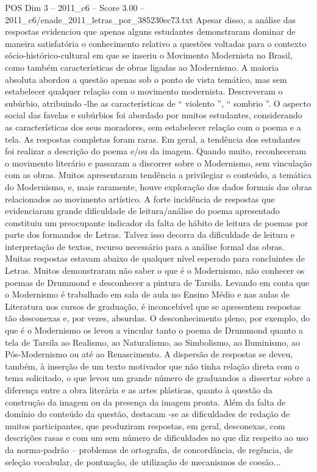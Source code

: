 \begin{textsample}{POS Dim 3 – 2011\_c6 – Score 3.00 – 2011\_c6/enade\_2011\_letras\_por\_385230ec73.txt}
Apesar disso, a análise das respostas evidenciou que apenas alguns estudantes demonstraram dominar de maneira satisfatória o conhecimento relativo a questões voltadas para o contexto sócio-histórico-cultural em que se inseriu o Movimento Modernista no Brasil, como também características de obras ligadas ao Modernismo.
A maioria absoluta abordou a questão apenas sob o ponto de vista temático, mas sem estabelecer qualquer relação com o movimento modernista.
Descreveram o subúrbio, atribuindo -lhe as características de “ violento ”, “ sombrio ”.
O aspecto social das favelas e subúrbios foi abordado por muitos estudantes, considerando as características dos seus moradores, sem estabelecer relação com o poema e a tela.
As respostas completas foram raras.
Em geral, a tendência dos estudantes foi realizar a descrição do poema e/ou da imagem.
Quando muito, reconheceram o movimento literário e passaram a discorrer sobre o Modernismo, sem vinculação com as obras.
Muitos apresentaram tendência a privilegiar o conteúdo, a temática do Modernismo, e, mais raramente, houve exploração dos dados formais das obras relacionados ao movimento artístico.
A forte incidência de respostas que evidenciaram grande dificuldade de leitura/análise do poema apresentado constituiu um preocupante indicador da falta de hábito de leitura de poemas por parte dos formandos de Letras.
Talvez isso decorra da dificuldade de leitura e interpretação de textos, recurso necessário para a análise formal das obras.
Muitas respostas estavam abaixo de qualquer nível esperado para concluintes de Letras.
Muitos demonstraram não saber o que é o Modernismo, não conhecer os poemas de Drummond e desconhecer a pintura de Tarsila.
Levando em conta que o Modernismo é trabalhado em sala de aula no Ensino Médio e nas aulas de Literatura nos cursos de graduação, é inconcebível que se apresentem respostas tão desconexas e, por vezes, absurdas.
O desconhecimento pleno, por exemplo, do que é o Modernismo os levou a vincular tanto o poema de Drummond quanto a tela de Tarsila ao Realismo, ao Naturalismo, ao Simbolismo, ao Iluminismo, ao Pós-Modernismo ou até ao Renascimento.
A dispersão de respostas se deveu, também, à inserção de um texto motivador que não tinha relação direta com o tema solicitado, o que levou um grande número de graduandos a dissertar sobre a diferença entre a obra literária e as artes plásticas, quanto à questão da construção da imagem ou da presença da imagem pronta.
Além da falta de domínio do conteúdo da questão, destacam -se as dificuldades de redação de muitos participantes, que produziram respostas, em geral, desconexas, com descrições rasas e com um sem número de dificuldades no que diz respeito ao uso da norma-padrão – problemas de ortografia, de concordância, de regência, de seleção vocabular, de pontuação, de utilização de mecanismos de coesão...

\end{textsample}
